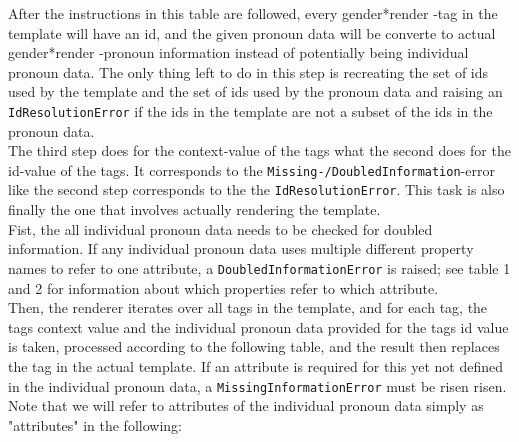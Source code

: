 \documentclass{article}
\newcommand{\GenderRender}{
    gender*render
}
\begin{document}
    After the instructions in this table are followed, every \GenderRender-tag in the template will have an id, and the given pronoun data will be converte to actual \GenderRender-pronoun information instead of potentially being individual pronoun data.
    The only thing left to do in this step is recreating the set of ids used by the template and the set of ids used by the pronoun data and raising an \texttt{IdResolutionError} if the ids in the template are not a subset of the ids in the pronoun data.\\

    The third step does for the context-value of the tags what the second does for the id-value of the tags.
    It corresponds to the \texttt{Missing-/DoubledInformation}-error like the second step corresponds to the the \texttt{IdResolutionError}.
    This task is also finally the one that involves actually rendering the template.\\

    Fist, the all individual pronoun data needs to be checked for doubled information.
    If any individual pronoun data uses multiple different property names to refer to one attribute, a \texttt{DoubledInformationError} is raised;
    see table 1 and 2 for information about which properties refer to which attribute.\\

    Then, the renderer iterates over all tags in the template, and for each tag, the tags context value and the individual pronoun data provided for the tags id value is taken, processed according to the following table, and the result then replaces the tag in the actual template.
    If an attribute is required for this yet not defined in the individual pronoun data, a \texttt{MissingInformationError} must be risen risen.
    Note that we will refer to attributes of the individual pronoun data simply as "attributes" in the following:
\end{document}
